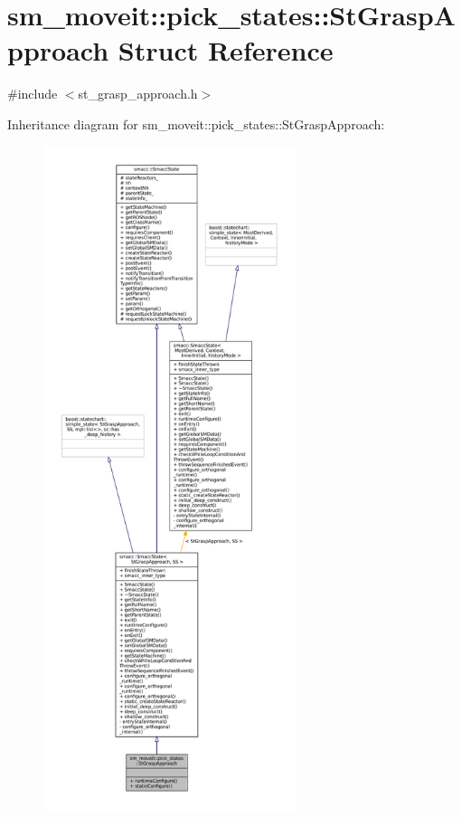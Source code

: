 \hypertarget{structsm__moveit_1_1pick__states_1_1StGraspApproach}{}\section{sm\+\_\+moveit\+:\+:pick\+\_\+states\+:\+:St\+Grasp\+Approach Struct Reference}
\label{structsm__moveit_1_1pick__states_1_1StGraspApproach}


{\ttfamily \#include $<$st\+\_\+grasp\+\_\+approach.\+h$>$}



Inheritance diagram for sm\+\_\+moveit\+:\+:pick\+\_\+states\+:\+:St\+Grasp\+Approach\+:
\nopagebreak
\begin{figure}[H]
\begin{center}
\leavevmode
\includegraphics[height=550pt]{structsm__moveit_1_1pick__states_1_1StGraspApproach__inherit__graph}
\end{center}
\end{figure}


